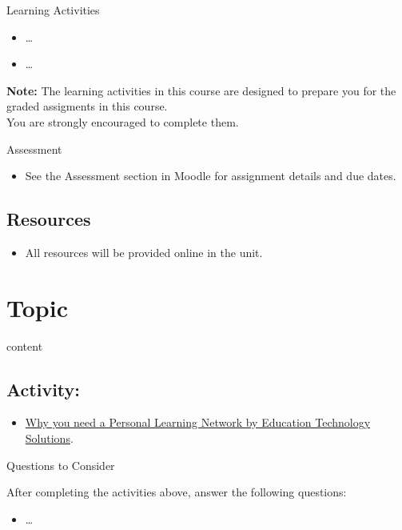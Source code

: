 \documentclass[
]{book}
\providecommand{\tightlist}{%
  \setlength{\itemsep}{0pt}\setlength{\parskip}{0pt}}
\theoremstyle{definition}
\theoremstyle{definition}
\theoremstyle{definition}
\theoremstyle{definition}
\theoremstyle{remark}
\begin{document}
\begin{reflect}
{Learning Activities}

\begin{itemize}
\tightlist
\item
  \ldots{}
\item
  \ldots{}
\end{itemize}

\textbf{Note:} The learning activities in this course are designed to prepare you for the graded assigments in this course.\\
You are strongly encouraged to complete them.
\end{reflect}

\begin{assessment}
{Assessment}

\begin{itemize}
\tightlist
\item
  See the Assessment section in Moodle for assignment details and due dates.
\end{itemize}
\end{assessment}

\hypertarget{resources-4}{%
\subsection*{Resources}\label{resources-4}}

\begin{itemize}
\tightlist
\item
  All resources will be provided online in the unit.
\end{itemize}

\hypertarget{topic-6}{%
\section{Topic}\label{topic-6}}

content

\hypertarget{activity-10}{%
\subsection*{Activity:}\label{activity-10}}

\begin{reflect}
\begin{itemize}
\tightlist
\item
  \href{https://educationtechnologysolutions.com/2014/07/why-you-need-a-personal-learning-network/}{Why you need a Personal Learning Network by Education Technology Solutions}.
\end{itemize}

{Questions to Consider}

After completing the activities above, answer the following questions:

\begin{itemize}
\tightlist
\item
  \ldots{}
\end{itemize}
\end{reflect}
\end{document}
